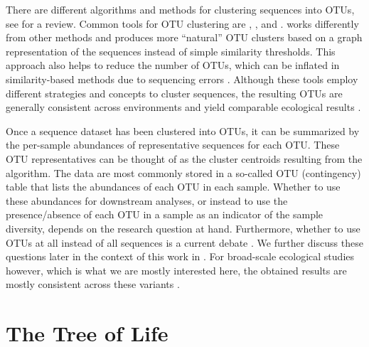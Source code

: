 There are different algorithms and methods for clustering sequences into \acp{OTU},
see  for a review.
Common tools for \ac{OTU} clustering are  \cite{Edgar2010},
 \cite{Rognes2016}, and  \cite{Mahe2014,Mahe2015}.
 works differently from other methods and produces more ``natural'' OTU clusters
based on a graph representation of the sequences instead of simple similarity thresholds.
This approach also helps to reduce the number of \acp{OTU},
which can be inflated in similarity-based methods due to sequencing errors \cite{Mahe2015,Kunin2010}.
Although these tools employ different strategies and concepts to cluster sequences,
the resulting \acp{OTU} are generally consistent across environments and yield comparable ecological results \cite{Schmidt2014}.

Once a sequence dataset has been clustered into \acp{OTU},
it can be summarized by the per-sample abundances of representative sequences for each \ac{OTU}.
These \ac{OTU} representatives can be thought of as the cluster centroids resulting from the algorithm.
The data are most commonly stored in a so-called OTU (contingency) table
that lists the abundances of each \ac{OTU} in each sample.
Whether to use these abundances for downstream analyses,
or instead to use the presence/absence of each \ac{OTU} in a sample as an indicator of the sample diversity,
depends on the research question at hand.
Furthermore, whether to use \acp{OTU} at all instead of all sequences is a current debate \cite{Callahan2017,Glassman2018}.
We further discuss these questions later in the context of this work in
.
For broad-scale ecological studies however, which is what we are mostly interested here,
the obtained results are mostly consistent across these variants \cite{Glassman2018}.



\section{The Tree of Life}
\label{ch:Foundations:sec:TreeOfLife}


